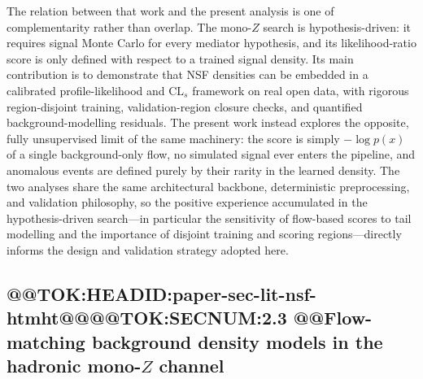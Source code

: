 \documentclass[11pt]{article}
\begin{document}
The relation between that work and the present analysis is one of complementarity rather than overlap. The mono-$Z$ search is hypothesis-driven: it requires signal Monte Carlo for every mediator hypothesis, and its likelihood-ratio score is only defined with respect to a trained signal density. Its main contribution is to demonstrate that NSF densities can be embedded in a calibrated profile-likelihood and $\mathrm{CL}_{s}$ framework on real open data, with rigorous region-disjoint training, validation-region closure checks, and quantified background-modelling residuals. The present work instead explores the opposite, fully unsupervised limit of the same machinery: the score is simply $-\log p(x)$ of a single background-only flow, no simulated signal ever enters the pipeline, and anomalous events are defined purely by their rarity in the learned density. The two analyses share the same architectural backbone, deterministic preprocessing, and validation philosophy, so the positive experience accumulated in the hypothesis-driven search---in particular the sensitivity of flow-based scores to tail modelling and the importance of disjoint training and scoring regions---directly informs the design and validation strategy adopted here.

\subsection{@@TOK:HEADID:paper-sec-lit-nsf-htmht@@@@TOK:SECNUM:2.3 @@Flow-matching background density models in the hadronic mono-$Z$ channel}
\end{document}
